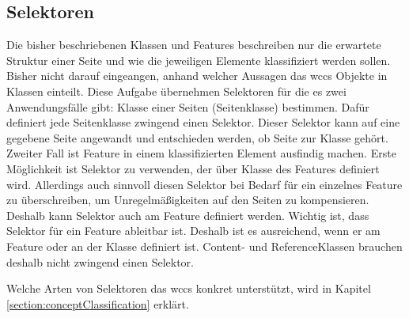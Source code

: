     \subsection{Selektoren}
        \label{section:conteptSelectors}
        Die bisher beschriebenen Klassen und Features beschreiben nur
        die erwartete Struktur einer Seite und wie die jeweiligen Elemente klassifiziert
        werden sollen.
        Bisher nicht darauf eingeangen, anhand welcher Aussagen das \gls{wccs} Objekte
        in Klassen einteilt.
        Diese Aufgabe übernehmen Selektoren für die es zwei Anwendungsfälle gibt:
        Klasse einer Seiten (Seitenklasse) bestimmen.
        Dafür definiert jede Seitenklasse zwingend einen Selektor.
        Dieser Selektor kann auf eine gegebene Seite angewandt und entschieden werden,
        ob Seite zur Klasse gehört.
        Zweiter Fall ist Feature in einem klassifizierten Element ausfindig machen.
        Erste Möglichkeit ist Selektor zu verwenden, der über Klasse des Features definiert wird.
        Allerdings auch sinnvoll diesen Selektor bei Bedarf für ein einzelnes Feature zu überschreiben,
        um Unregelmäßigkeiten auf den Seiten zu kompensieren.
        Deshalb kann Selektor auch am Feature definiert werden.
        Wichtig ist, dass Selektor für ein Feature ableitbar ist.
        Deshalb ist es ausreichend, wenn er am Feature oder an der Klasse definiert ist.
        Content- und ReferenceKlassen brauchen deshalb nicht zwingend einen Selektor.

        Welche Arten von Selektoren das \gls{wccs} konkret unterstützt,
        wird in Kapitel \ref{section:conceptClassification} erklärt.